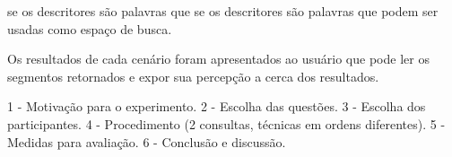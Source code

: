 se os descritores são palavras que 
se os descritores são palavras que podem ser usadas como espaço de busca.







Os resultados de cada cenário foram apresentados ao usuário que pode ler os segmentos retornados e expor sua percepção a cerca dos resultados.


 1 - Motivação para o experimento.
 2 - Escolha das questões.
 3 - Escolha dos participantes.
 4 - Procedimento (2 consultas, técnicas em ordens diferentes).
 5 - Medidas para avaliação.
 6 - Conclusão e discussão.



